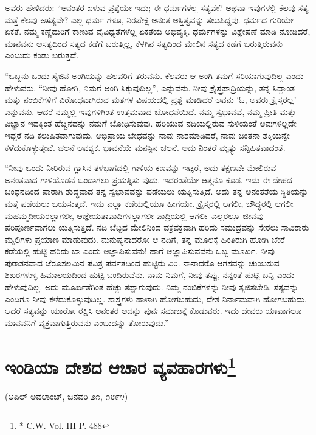 ಅವರು ಹೇಳಿದರು: “ಅನಂತರ ಏಳುವ ಪ್ರಶ್ನೆಯೇ ಇದು; ಈ ಧರ್ಮಗಳೆಲ್ಲ ಸತ್ಯವೇ? ಅಥವಾ ಇವುಗಳಲ್ಲಿ ಕೆಲವು ಸತ್ಯ ಮತ್ತೆ ಕೆಲವು ಅಸತ್ಯವೇ? ಎಲ್ಲ ಧರ್ಮ ಗಳೂ, ನಿರಪೇಕ್ಷ ಅನಂತ ಅಸ್ತಿತ್ವವನ್ನು ತಲುಪಿದ್ದವು. ಧರ್ಮದ ಗುರಿಯೇ ಏಕತೆ. ನಮ್ಮ ಕಣ್ಣೆದುರಿಗೆ ಕಾಣುವ ವೈವಿಧ್ಯತೆಗಳೆಲ್ಲ ಏಕತೆಯ ಅಭಿವ್ಯಕ್ತಿ. ಧರ್ಮಗಳನ್ನು ವಿಶ್ಲೇಷಣೆ ಮಾಡಿ ನೋಡಿದರೆ, ಮಾನವನು ಅಸತ್ಯದಿಂದ ಸತ್ಯದ ಕಡೆಗೆ ಬರುತ್ತಿಲ್ಲ, ಕೆಳಗಿನ ಸತ್ಯದಿಂದ ಮೇಲಿನ ಸತ್ಯದ ಕಡೆಗೆ ಬರುತ್ತಿರುವನು ಎಂಬುದು ಕಂಡು ಬರುತ್ತದೆ.

“ಒಬ್ಬನು ಒಂದು ಸೈಜಿನ ಅಂಗಿಯನ್ನು ಹಲವರಿಗೆ ತರುವನು. ಕೆಲವರು ಆ ಅಂಗಿ ತಮಗೆ ಸರಿಯಾಗುವುದಿಲ್ಲ ಎಂದು ಹೇಳುವರು. “ನೀವು ಹೋಗಿ, ನಿಮಗೆ ಅಂಗಿ ಸಿಕ್ಕುವುದಿಲ್ಲ”, ಎನ್ನುವನು. ನೀವು ಕ್ರೈಸ್ತ್ರಪಾದ್ರಿಯನ್ನು, ತನ್ನ ಸಿದ್ದಾಂತ ಮತ್ತು ನಂಬಿಕೆಗಳಿಗೆ ವಿರೋಧವಾಗಿರುವ ಮತಗಳ ವಿಷಯದಲ್ಲಿ ಪ್ರಶ್ನೆ ಮಾಡಿದರೆ ಅವನು ‘ಓ, ಅವರು ಕ್ರೈಸ್ತರಲ್ಲ’ ಎನ್ನುವನು. ಆದರೆ ನಮ್ಮಲ್ಲಿ ಇವುಗಳಿಗಿಂತ ಉತ್ತಮವಾದ ಬೋಧನೆಯಿದೆ. ನಮ್ಮ ಸ್ವಭಾವವೆ, ನಮ್ಮ ಪ್ರೀತಿ ಮತ್ತು ವಿಜ್ಞಾನ ಇದಕ್ಕಿಂತ ಹೆಚ್ಚಿನದನ್ನು ನಮಗೆ ಬೋಧಿಸುವುವು. ಹರಿಯುವ ನದಿಯಲ್ಲಿರುವ ಸುಳಿಯಂತೆ ಅವುಗಳಿಲ್ಲದೇ ಇದ್ದರೆ ನದಿ ಕಲುಷಿತವಾಗುವುದು. ಅಭಿಪ್ರಾಯ ಬೇಧವನ್ನು ನಾವು ನಾಶಮಾಡಿದರೆ, ನಾವು ಚಿಂತನಾ ಶಕ್ತಿಯನ್ನೇ ಕಳೆದುಕೊಳ್ಳುತ್ತೇವೆ. ಚಲನೆ ಆವಶ್ಯಕ. ಭಾವನೆಯೆ ಮನಸ್ಸಿನ ಚಲನೆ. ಅದು ನಿಂತರೆ ಮೃತ್ಯು ಸನ್ನಿಹಿತವಾದಂತೆ.

“ನೀವು ಒಂದು ನೀರಿರುವ ಗ್ಲಾಸಿನ ತಳಭಾಗದಲ್ಲಿ ಗಾಳಿಯ ಕಣವನ್ನು ಇಟ್ಟರೆ, ಅದು ತಕ್ಷಣವೇ ಮೇಲಿರುವ ಅನಂತವಾದ ಗಾಳಿಯೊಡನೆ ಒಂದಾಗಲು ಪ್ರಯತ್ನಿಸು ವುದು. ಇದರಂತೆಯೇ ಆತ್ಮನೂ ಕೂಡ. ಇದು ಈ ದೇಹದ ಬಂಧನದಿಂದ ಪಾರಾಗಿ ಶುದ್ಧವಾದ ತನ್ನ ಸ್ವಭಾವವನ್ನು ಪಡೆಯಲು ಯತ್ನಿಸುತ್ತಿದೆ. ಅದು ತನ್ನ ಅನಂತತೆಯ ಸ್ಥಿತಿಯನ್ನು ಮತ್ತೆ ಪಡೆಯಲು ಬಯಸುತ್ತದೆ. ಇದು ಎಲ್ಲಾ ಕಡೆಯಲ್ಲಿಯೂ ಹೀಗೆಯೇ. ಕ್ರೈಸ್ತರಲ್ಲಿ ಆಗಲೀ, ಬೌದ್ಧರಲ್ಲಿ ಆಗಲೀ ಮಹಮ್ಮದೀಯರಲ್ಲಾಗಲೀ, ಆಜ್ಞೇಯತಾವಾದಿಗಳಲ್ಲಾಗಲೀ ಪಾದ್ರಿಯಲ್ಲಿ ಆಗಲೀ–ಎಲ್ಲರಲ್ಲೂ ಜೀವವು ಪರಿಪೂರ್ಣವಾಗಲು ಯತ್ನಿಸುತ್ತಿದೆ. ನದಿ ಬೆಟ್ಟದ ಮೇಲಿನಿಂದ ವಕ್ರವಕ್ರವಾಗಿ ಹರಿದು ಸಮುದ್ರವನ್ನು ಸೇರಲು ಸಾವಿರಾರು ಮೈಲಿಗಳು ಪ್ರಯಾಣ ಮಾಡುವುದು. ಮನುಷ್ಯನಾದರೋ ಆ ನದಿಗೆ, ತನ್ನ ಮೂಲಕ್ಕೆ ಹಿಂತಿರುಗಿ ಹೋಗಿ ಬೇರೆ ಕಡೆಯಲ್ಲಿ ಹುಟ್ಟಿ ಹರಿದು ಬಾ ಎಂದು ಆಜ್ಞಾಪಿಸುವನು! ಹಾಗೆ ಆಜ್ಞಾಪಿಸುವವನು ಒಬ್ಬ ಮೂರ್ಖ. ನೀವು ಪುರಾತನವಾದ ಜೆರೂಸಲಮಿನ ಪವಿತ್ರ ಪರ್ವತದಿಂದ ಹುಟ್ಟಿರು ವಿರಿ. ನಾನಾದರೊ ಆಗಸವನ್ನು ಚುಂಬಿಸುವ ಶಿಖರಗಳುಳ್ಳ ಹಿಮಾಲಯದಿಂದ ಹುಟ್ಟಿ ಬಂದಿರುವೆನು. ನಾನು ನಿಮಗೆ, ನೀವು ತಪ್ಪು, ನನ್ನಂತೆ ಹುಟ್ಟಿ ಬನ್ನಿ ಎಂದು ಹೇಳುವುದಿಲ್ಲ. ಅದು ಮೂರ್ಖತೆಗಿಂತ ಹೆಚ್ಚು ತಪ್ಪಾಗುವುದು. ನಿಮ್ಮ ನಂಬಿಕೆಗಳನ್ನು ನೀವು ತ್ಯಜಿಸಬೇಡಿ. ಸತ್ಯವನ್ನು ಎಂದಿಗೂ ನೀವು ಕಳೆದುಕೊಳ್ಳುವುದಿಲ್ಲ. ಶಾಸ್ತ್ರಗಳು ಹಾಳಾಗಿ ಹೋಗಬಹುದು, ದೇಶ ನಿರ್ನಾಮವಾಗಿ ಹೋಗಬಹುದು. ಆದರೆ ಸತ್ಯವನ್ನು ಯಾರೋ ರಕ್ಷಿಸಿ ಅನಂತರ ಅದನ್ನು ಪುನಃ ಸಮಾಜಕ್ಕೆ ಕೊಡುವರು. ಇದು ದೇವರು ಯಾವಾಗಲೂ ಮಾನವನಿಗೆ ವ್ಯಕ್ತವಾಗುತ್ತಿರುವನು ಎಂಬುದನ್ನು ತೋರುವುದು.”


\section{ಇಂಡಿಯಾ ದೇಶದ ಆಚಾರ ವ್ಯವಹಾರಗಳು\protect\footnote{* C.W. Vol. III P. 488}}

\begin{center}
(ಅಪಿಲ್​ ಅವಲಾಂಚ್​, ಜನವರಿ ೨೧, ೧೮೯೪)
\end{center}

